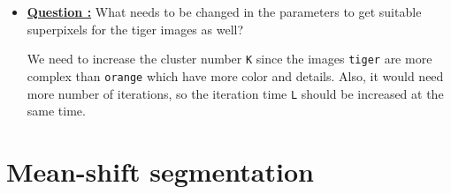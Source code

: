 \documentclass[11pt,a4paper]{article}
\begin{document}
\begin{itemize}
	\item\addtocounter{Counter}{1}\underline{\textbf{Question :}} What needs to be changed in the parameters to get suitable superpixels for the tiger images as well?
		\par We need to increase the cluster number \texttt{K} since the images \texttt{tiger} are more complex than \texttt{orange} which have more color and details. Also, it would need more number of iterations, so the iteration time \texttt{L} should be increased at the same time.

\end{itemize}

\section{Mean-shift segmentation}
\end{document}
